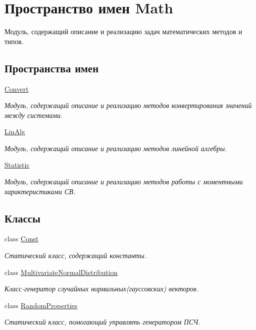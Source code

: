 \hypertarget{namespace_math}{}\section{Пространство имен Math}
\label{namespace_math}


Модуль, содержащий описание и реализацию задач математических методов и типов.  


\subsection*{Пространства имен}
\begin{DoxyCompactItemize}
\item 
 \hyperlink{namespace_math_1_1_convert}{Convert}
\begin{DoxyCompactList}\small\item\em Модуль, содержащий описание и реализацию методов конвертирования значений между системами. \end{DoxyCompactList}\item 
 \hyperlink{namespace_math_1_1_lin_alg}{Lin\+Alg}
\begin{DoxyCompactList}\small\item\em Модуль, содержащий описание и реализацию методов линейной алгебры. \end{DoxyCompactList}\item 
 \hyperlink{namespace_math_1_1_statistic}{Statistic}
\begin{DoxyCompactList}\small\item\em Модуль, содержащий описание и реализацию методов работы с моментными характеристиками СВ. \end{DoxyCompactList}\end{DoxyCompactItemize}
\subsection*{Классы}
\begin{DoxyCompactItemize}
\item 
class \hyperlink{class_math_1_1_const}{Const}
\begin{DoxyCompactList}\small\item\em Статический класс, содержащий константы. \end{DoxyCompactList}\item 
class \hyperlink{class_math_1_1_multivariate_normal_distribution}{Multivariate\+Normal\+Distribution}
\begin{DoxyCompactList}\small\item\em Класс-\/генератор случайных нормальных(гауссовских) векторов. \end{DoxyCompactList}\item 
class \hyperlink{class_math_1_1_random_properties}{Random\+Properties}
\begin{DoxyCompactList}\small\item\em Статический класс, помогающий управлять генератором ПСЧ. \end{DoxyCompactList}\end{DoxyCompactItemize}
